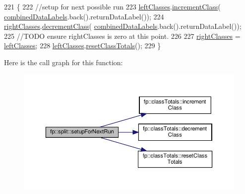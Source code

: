 \begin{DoxyCode}
221                                              \{
222                     \textcolor{comment}{//setup for next possible run}
223                     \hyperlink{classfp_1_1split_a3be6dcf32281715e6376e9f5f8da18f0}{leftClasses}.\hyperlink{classfp_1_1classTotals_aa05c13b36638adc361d638559c43a447}{incrementClass}(
      \hyperlink{classfp_1_1split_ac8f54cf4a42335814e10e351c49e3c32}{combinedDataLabels}.back().returnDataLabel());
224                     \hyperlink{classfp_1_1split_af5366297f7de9b8ff0911186300bab7e}{rightClasses}.\hyperlink{classfp_1_1classTotals_af388dc1e664488603f7834da2f097a06}{decrementClass}(
      \hyperlink{classfp_1_1split_ac8f54cf4a42335814e10e351c49e3c32}{combinedDataLabels}.back().returnDataLabel());
225                     \textcolor{comment}{//TODO ensure rightClasses is zero at this point.}
226 
227                     \hyperlink{classfp_1_1split_af5366297f7de9b8ff0911186300bab7e}{rightClasses} = \hyperlink{classfp_1_1split_a3be6dcf32281715e6376e9f5f8da18f0}{leftClasses};
228                     \hyperlink{classfp_1_1split_a3be6dcf32281715e6376e9f5f8da18f0}{leftClasses}.\hyperlink{classfp_1_1classTotals_ab0ad9daa63bc410ae15f344b86386f87}{resetClassTotals}();
229                 \}
\end{DoxyCode}
Here is the call graph for this function\+:\nopagebreak
\begin{figure}[H]
\begin{center}
\leavevmode
\includegraphics[width=350pt]{classfp_1_1split_a5ccfceb36e8ea567816af95bb4ae4fea_cgraph}
\end{center}
\end{figure}
\mbox{\label{classfp_1_1split_a7b34c093da10d549e3750c641dfa991d}} 
